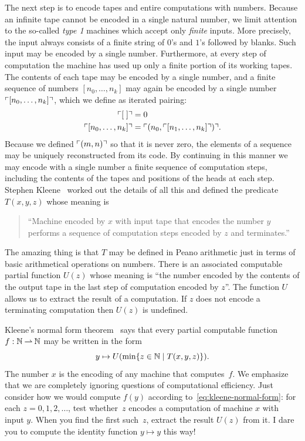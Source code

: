The next step is to encode tapes and entire computations with numbers.
Because an infinite tape cannot be encoded in a single natural number,
we limit attention to the so-called \emph{type 1} machines which
accept only \emph{finite} inputs. More precisely, the input always
consists of a finite string of $0$'s and $1$'s followed by blanks.
Such input may be encoded by a single number. Furthermore, at every
step of computation the machine has used up only a finite portion of
its working tapes. The contents of each tape may be encoded by a
single number, and a finite sequence of numbers $[n_0, \ldots, n_k]$
may again be encoded by a single number $\ulcorner [n_0, \ldots, n_k] \urcorner$,
which we define as iterated pairing:
%
\begin{align*}
  \ulcorner [\;] \urcorner &= 0 \\
  \ulcorner [n_0, \ldots, n_k] \urcorner &= \ulcorner (n_0, \ulcorner [n_1, \ldots, n_k] \urcorner) \urcorner.
\end{align*}
%
Because we defined $\ulcorner (m,n) \urcorner$ so that it is never zero, the
elements of a sequence may be uniquely reconstructed from its code. By
continuing in this manner we may encode with a single number a finite
sequence of computation steps, including the contents of the tapes
and positions of the heads at each step. Stephen Kleene~
worked out the details of all this and defined the predicate
$T(x,y,z)$ whose meaning is
%
\begin{quote}
  ``Machine encoded by $x$ with input tape that encodes the number $y$
  performs a sequence of computation steps encoded by $z$ and
  terminates.''
\end{quote}
%
The amazing thing is that $T$ may be defined in Peano arithmetic just
in terms of basic arithmetical operations on numbers. There is an
associated computable partial function $U(z)$ whose meaning is ``the
number encoded by the contents of the output tape in the last step of
computation encoded by $z$''. The function $U$ allows us to extract
the result of a computation. If $z$ does not encode a terminating
computation then $U(z)$ is undefined.

Kleene's normal form theorem~
says that every partial computable function $f : \mathbb{N} \mathbin{\rightharpoonup} \mathbb{N}$ may
be written in the form
%
\begin{equation}
  \label{eq:kleene-normal-form}
  y \mapsto U(\min \{z \in \mathbb{N} \mid T(x,y,z)\}).
\end{equation}
%
The number $x$ is the encoding of any machine that computes~$f$. We
emphasize that we are completely ignoring questions of computational
efficiency. Just consider how we would compute $f(y)$ according
to~\eqref{eq:kleene-normal-form}: for each $z = 0, 1, 2, \ldots$, test
whether~$z$ encodes a computation of machine $x$ with input $y$. When
you find the first such~$z$, extract the result $U(z)$ from it. I dare
you to compute the identity function $y \mapsto y$ this way!

